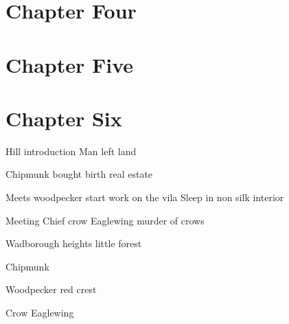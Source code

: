 \documentclass[smalldemyvopaper,11pt,twoside,onecolumn,openright,extrafontsizes]{memoir}
\begin{document}
\chapter{Chapter Four}
\lipsum[61-80]
\chapter{Chapter Five}
\lipsum[81-100]
\chapter{Chapter Six}
\lipsum[101-120]


 Hill introduction Man left land

 Chipmunk bought birth real estate

 Meets woodpecker start work on the vila
 Sleep in non silk interior

Meeting Chief crow Eaglewing murder of crows

Wadborough heights little forest 

Chipmunk 

Woodpecker 
red crest

Crow Eaglewing

\end{document}

